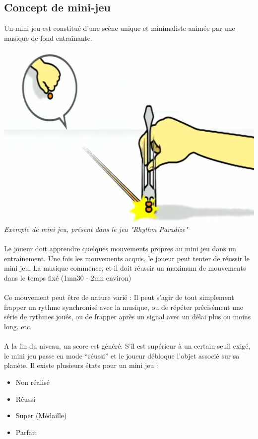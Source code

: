 \documentclass[a4paper,11pt]{article}
\begin{document}
\subsection{Concept de mini-jeu}
Un mini jeu est constitué d’une scène unique et minimaliste animée par une musique de fond entraînante.
\begin{center}
\includegraphics[scale=0.4]{rhythmParadise.png}\\
\textit{Exemple de mini jeu, présent dans le jeu "Rhythm Paradize"}
\end{center}
\paragraph{} Le joueur doit apprendre quelques mouvements propres au mini jeu dans un entraînement. Une fois les mouvements acquis, le joueur peut tenter de réussir le mini jeu. La musique commence, et il doit réussir un maximum de mouvements dans le temps fixé (1mn30 - 2mn environ)
\paragraph{} Ce mouvement peut être de nature varié : Il peut s’agir de tout simplement frapper un rythme synchronisé avec la musique, ou de répéter précisément une série de rythmes joués, ou de frapper après un signal avec un délai plus ou moins long, etc.
\paragraph{} A la fin du niveau, un score est généré. S’il est supérieur à un certain seuil exigé, le mini jeu passe en mode “réussi” et le joueur débloque l’objet associé sur sa planète.
Il existe plusieurs états pour un mini jeu :
\begin{itemize}
\item Non réalisé
\item Réussi
\item Super (Médaille)
\item Parfait
\end{itemize}
\end{document}
